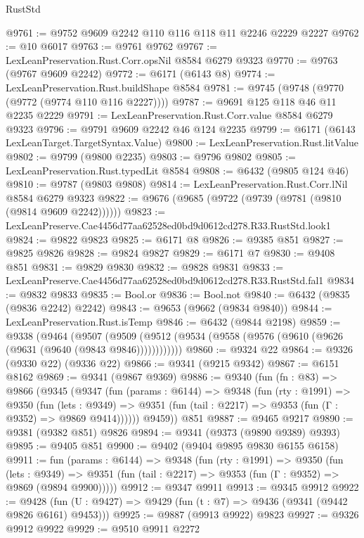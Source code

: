 \begin{lexlean}{RustStd}
\begin{coremodule}
@9761 := @9752 @9609 @2242 @110 @116 @118 @11 @2246 @2229 @2227
@9762 := @10 @6017
@9763 := @9761 @9762
@9767 := LexLeanPreservation.Rust.Corr.opsNil @8584 @6279 @9323
@9770 := @9763 (@9767 @9609 @2242)
@9772 := @6171 (@6143 @8)
@9774 := LexLeanPreservation.Rust.buildShape @8584
@9781 := @9745 (@9748 (@9770 (@9772 (@9774 @110 @116 @2227))))
@9787 := @9691 @125 @118 @46 @11 @2235 @2229
@9791 := LexLeanPreservation.Rust.Corr.value @8584 @6279 @9323
@9796 := @9791 @9609 @2242 @46 @124 @2235
@9799 := @6171 (@6143 LexLeanTarget.TargetSyntax.Value)
@9800 := LexLeanPreservation.Rust.litValue
@9802 := @9799 (@9800 @2235)
@9803 := @9796 @9802
@9805 := LexLeanPreservation.Rust.typedLit @8584
@9808 := @6432 (@9805 @124 @46)
@9810 := @9787 (@9803 @9808)
@9814 := LexLeanPreservation.Rust.Corr.lNil @8584 @6279 @9323
@9822 := @9676 (@9685 (@9722 (@9739 (@9781 (@9810 (@9814 @9609 @2242))))))
@9823 := LexLeanPreserve.Cae4456d77aa62528ed0bd9d0612cd278.R33.RustStd.look1
@9824 := @9822 @9823
@9825 := @6171 @8
@9826 := @9385 @851
@9827 := @9825 @9826
@9828 := @9824 @9827
@9829 := @6171 @7
@9830 := @9408 @851
@9831 := @9829 @9830
@9832 := @9828 @9831
@9833 := LexLeanPreserve.Cae4456d77aa62528ed0bd9d0612cd278.R33.RustStd.fal1
@9834 := @9832 @9833
@9835 := Bool.or
@9836 := Bool.not
@9840 := @6432 (@9835 (@9836 @2242) @2242)
@9843 := @9653 (@9662 (@9834 @9840))
@9844 := LexLeanPreservation.Rust.isTemp
@9846 := @6432 (@9844 @2198)
@9859 := @9338
    (@9464
      (@9507 (@9509 (@9512 (@9534 (@9558 (@9576 (@9610 (@9626 (@9631 (@9640 (@9843 @9846))))))))))))
@9860 := @9324 @22
@9864 := @9326 (@9330 @22) (@9336 @22)
@9866 := @9341 (@9215 @9342)
@9867 := @6151 @8162
@9869 := @9341 (@9867 @9369)
@9886 := @9340
    (fun (fn : @83) =>
    @9866
      (@9345
        (@9347
          (fun (params : @6144) =>
          @9348
            (fun (rty : @1991) =>
            @9350
              (fun (lets : @9349) =>
              @9351 (fun (tail : @2217) => @9353 (fun (Γ : @9352) => @9869 @9414))))))
        @9459))
    @851
@9887 := @9465 @9217
@9890 := @9381 (@9382 @851) @9826
@9894 := @9341 (@9373 (@9890 @9389) @9393)
@9895 := @9405 @851
@9900 := @9402 (@9404 @9895 @9830 @6155 @6158)
@9911 := fun (params : @6144) =>
  @9348
    (fun (rty : @1991) =>
    @9350
      (fun (lets : @9349) =>
      @9351 (fun (tail : @2217) => @9353 (fun (Γ : @9352) => @9869 (@9894 @9900)))))
@9912 := @9347 @9911
@9913 := @9345 @9912
@9922 := @9428 (fun (U : @9427) => @9429 (fun (t : @7) => @9436 (@9341 (@9442 @9826 @6161) @9453)))
@9925 := @9887 (@9913 @9922) @9823
@9927 := @9326 @9912 @9922
@9929 := @9510 @9911 @2272

\end{coremodule}
\end{lexlean}
